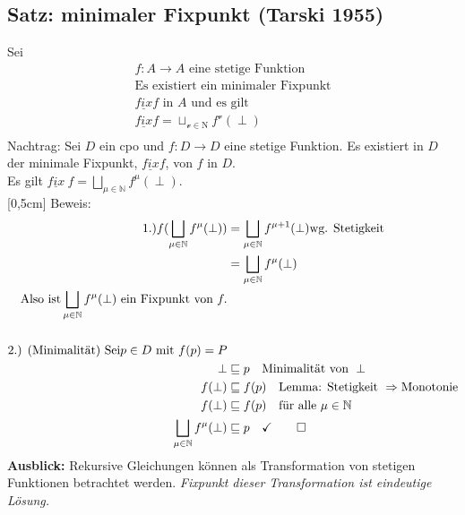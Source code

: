 \begin{compactitem}
\subsection{Satz: minimaler Fixpunkt (Tarski 1955)}
Sei
\begin{align*}
f: A \rightarrow A \text{ eine stetige Funktion} \\ 
\text{Es existiert ein minimaler Fixpunkt}\\
\underline{fix} f \text{ in } A \text { und es gilt}\\
\underline{fix} f = \sqcup_{\mathcal{v} \in \mathrm{N}} f^\mathcal{v}(\perp)\\
\end{align*}
Nachtrag: Sei $D$ ein cpo und $f:D \rightarrow D$ eine stetige Funktion. Es existiert in $D$ der minimale Fixpunkt, $\underline{fix} f$, von $f$ in $D$.\\
Es gilt $\underline{fix}\ f = \bigsqcup_{\mu \in \mathbb{N}} f^\mu (\perp)$.\\
[0,5cm]
Beweis:\\
\begin{align*}
\text{1.)} f(\bigsqcup_{\mu \in \mathbb{N}} f^\mu (\perp)) &= \bigsqcup_{\mu \in \mathbb{N}} f^{\mu +1 }(\perp) \text{wg. Stetigkeit}\\
&= \bigsqcup_{\mu \in \mathbb{N}} f^{\mu}(\perp)\\
\text{Also ist} \bigsqcup_{\mu \in \mathbb{N}} f^{\mu}(\perp) \text{ ein Fixpunkt von } f.\\
\\
\text{2.) (Minimalität) Sei} p \in D \text{ mit } f(p) = P\\
\perp  &\sqsubseteq p \quad \text{Minimalität von } \perp \\
f(\perp)  &\sqsubseteq f(p) \quad \text{Lemma: Stetigkeit } \Rightarrow \text{Monotonie}\\
f(\perp)  &\sqsubseteq f(p) \quad \text{für alle } \mu \in \mathbb{N}\\
\bigsqcup_{\mu \in \mathbb{N}} f^\mu (\perp)  &\sqsubseteq p \quad \checkmark \qed \\
\end{align*}
\textbf{Ausblick:} Rekursive Gleichungen können als Transformation von stetigen Funktionen betrachtet werden. \emph{Fixpunkt dieser Transformation ist eindeutige Lösung.}

\end{compactitem}
